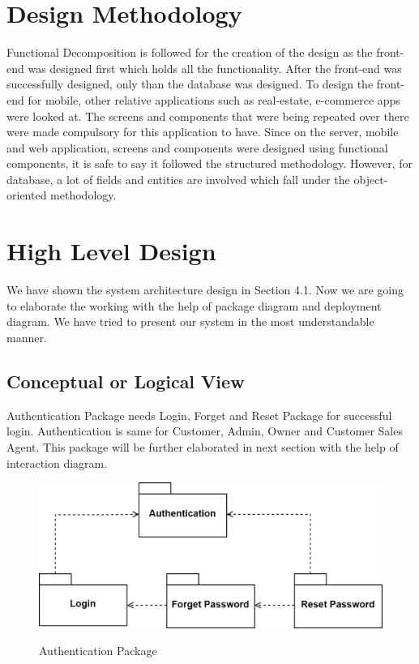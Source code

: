 \section{Design Methodology}

Functional Decomposition \cite{decom} is followed for the creation of the design as the front-end was designed first which holds all the functionality. After the front-end was successfully designed, only than the database was designed. To design the front-end for mobile, other relative applications such as real-estate, e-commerce apps were looked at. The screens and components that were being repeated over there were made compulsory for this application to have. Since on the server, mobile and web application, screens and components were designed using functional components, it is safe to say it followed the structured methodology. However, for database, a lot of fields and entities are involved which fall under the object-oriented methodology.

\section{High Level Design}
We have shown the system architecture design in Section 4.1. Now we are going to elaborate the working with the help of package diagram and deployment diagram. We have tried to present our system in the most understandable manner.

\subsection{Conceptual or Logical View}

Authentication Package needs Login, Forget and Reset Package for successful login. Authentication is same for Customer, Admin, Owner and Customer Sales Agent. This package will be further elaborated in next section with the help of interaction diagram.
\begin{figure}[H]
	\begin{center}
		{\includegraphics[scale=0.8]{figures/web Concept/web-auth package.png}}
		\caption{Authentication Package}
	\end{center}
\end{figure}

